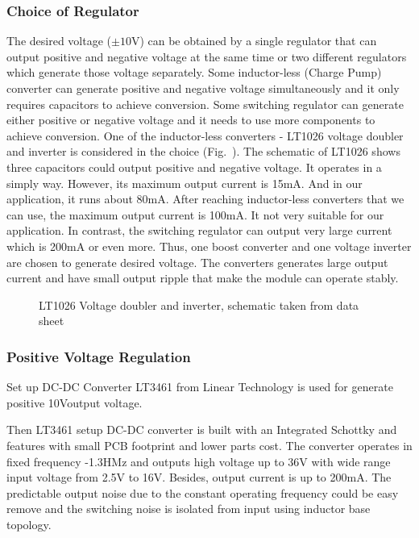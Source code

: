 \subsubsection{Choice of Regulator}
The desired voltage ($\pm10$V) can be obtained by a single regulator that can output positive and negative voltage at the same time or two different regulators which generate those voltage separately.  Some inductor-less (Charge Pump) converter can generate positive and negative voltage simultaneously and it only requires capacitors to achieve conversion.  Some switching regulator can generate either positive or negative voltage and it needs to use more components to achieve conversion. One of the inductor-less converters - LT1026 voltage doubler and inverter is considered in the choice (Fig.~). The schematic of LT1026 shows three capacitors could output positive and negative voltage. It operates in a simply way. However, its maximum output current is 15mA. And in our application, it runs about 80mA. After reaching inductor-less converters that we can use, the maximum output current is 100mA. It not very suitable for our application. In contrast, the switching regulator can output very large current which is 200mA or even more. Thus, one boost converter and one voltage inverter are chosen to generate desired voltage. The converters generates large output current and have small output ripple that make the module can operate stably.

\begin{figure}[!tbh]
	\centering
	\caption{LT1026 Voltage doubler and inverter, schematic taken from data sheet\cite{LT1026_datasheet}}
	\label{fig:LT1026}
\end{figure}

\subsubsection{Positive Voltage Regulation}
Set up DC-DC Converter LT3461 from Linear Technology is used for generate positive 10Voutput voltage.

Then LT3461 setup DC-DC converter is built with an Integrated Schottky and features with small PCB footprint and lower parts cost. The converter operates in fixed frequency -1.3HMz and outputs high voltage up to 36V with wide range input voltage from 2.5V to 16V. Besides, output current is up to 200mA. The predictable output noise due to the constant operating frequency could be easy remove and the switching noise is isolated from input using inductor base topology.

